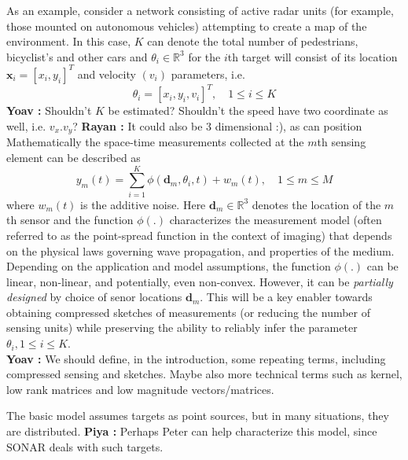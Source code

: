 \documentclass{article}
\newcommand{\comment}[3]{{\color{#1} {\bf #2 :} #3}}
\newcommand{\yoav}[1]{\comment{magenta}{Yoav}{#1}}
\newcommand{\piya}[1]{\comment{blue}{Piya}{#1}}
\newcommand{\rayan}[1]{\comment{red}{Rayan}{#1}}
\begin{document}
As an example, consider a network consisting of active radar units (for example, those mounted on autonomous vehicles) attempting to create a map of the environment. In this case, $K$ can denote the total number of pedestrians, bicyclist's and other cars and $\theta_i\in\mathbb{R}^3$ for the $i$th target will consist of its location $\mathbf{x}_i=[x_i,y_i]^T$ and velocity $(v_i)$ parameters, i.e.
\begin{equation} \theta_i = [ x_i, y_i, v_i ]^T, \quad 1\leq i\leq K  
\end{equation} 
\yoav{Shouldn't $K$ be estimated?  Shouldn't the speed have two coordinate as well, i.e. $v_x.v_y$?}
\rayan{It could also be 3 dimensional :), as can position}
Mathematically the space-time measurements collected at the $m$th sensing element can be described as \begin{equation} 
y_m (t) = \sum_{i=1}^{K} \phi (\mathbf{d}_m,\theta_i,t) + w_m(t), \quad 1\leq m\leq M
\end{equation}
where $w_m(t)$ is the additive noise. Here $\mathbf{d}_m\in \mathbb{R}^3$ denotes the location of the $m$th sensor and the function $\phi(.)$ characterizes the measurement model (often referred to as the point-spread function in the context of imaging) that depends on the physical laws governing wave propagation, and properties of the medium. Depending on the application and model assumptions, the function $\phi(.)$ can be linear, non-linear, and potentially, even non-convex. However, it can be {\em partially designed} by choice of senor locations $\mathbf{d}_m$. This will be a key enabler towards obtaining compressed sketches of measurements (or reducing the number of sensing units) while preserving the ability to reliably infer the parameter $\theta_i, 1\leq i\leq K$.\\
\yoav{We should define, in the introduction, some repeating terms, including compressed sensing and sketches. Maybe also more technical terms such as kernel, low rank matrices and low magnitude vectors/matrices.}


The basic model assumes targets as point sources, but in many situations, they are distributed. \piya{Perhaps Peter can help characterize this model, since SONAR deals with such targets}. 
\end{document}
